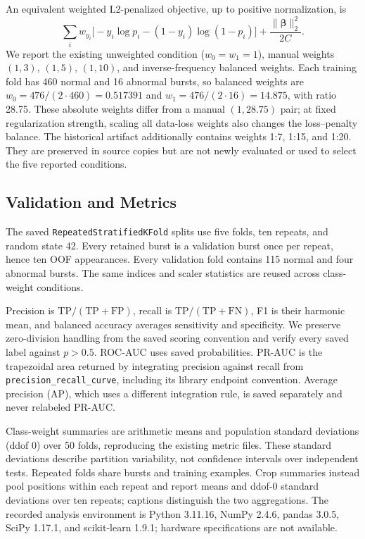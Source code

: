 \documentclass[10pt,twocolumn,letterpaper]{article}
\begin{document}
An equivalent weighted L2-penalized objective, up to positive normalization, is
\begin{equation}
\sum_i w_{y_i}\big[-y_i\log p_i-(1-y_i)\log(1-p_i)\big]
+\frac{\|\boldsymbol{\beta}\|_2^2}{2C}.
\end{equation}
We report the existing unweighted condition ($w_0=w_1=1$), manual weights $(1,3)$, $(1,5)$, $(1,10)$, and inverse-frequency balanced weights. Each training fold has 460 normal and 16 abnormal bursts, so balanced weights are $w_0=476/(2\cdot460)=0.517391$ and $w_1=476/(2\cdot16)=14.875$, with ratio 28.75. These absolute weights differ from a manual $(1,28.75)$ pair; at fixed regularization strength, scaling all data-loss weights also changes the loss--penalty balance. The historical artifact additionally contains weights 1:7, 1:15, and 1:20. They are preserved in source copies but are not newly evaluated or used to select the five reported conditions.

\subsection{Validation and Metrics}
The saved \texttt{RepeatedStratifiedKFold} splits use five folds, ten repeats, and random state 42. Every retained burst is a validation burst once per repeat, hence ten OOF appearances. Every validation fold contains 115 normal and four abnormal bursts. The same indices and scaler statistics are reused across class-weight conditions.

Precision is $\mathrm{TP}/(\mathrm{TP}+\mathrm{FP})$, recall is $\mathrm{TP}/(\mathrm{TP}+\mathrm{FN})$, F1 is their harmonic mean, and balanced accuracy averages sensitivity and specificity. We preserve zero-division handling from the saved scoring convention and verify every saved label against $p>0.5$. ROC-AUC uses saved probabilities. PR-AUC is the trapezoidal area returned by integrating precision against recall from \texttt{precision\_recall\_curve}, including its library endpoint convention. Average precision (AP), which uses a different integration rule, is saved separately and never relabeled PR-AUC.

Class-weight summaries are arithmetic means and population standard deviations (ddof 0) over 50 folds, reproducing the existing metric files. These standard deviations describe partition variability, not confidence intervals over independent tests. Repeated folds share bursts and training examples. Crop summaries instead pool positions within each repeat and report means and ddof-0 standard deviations over ten repeats; captions distinguish the two aggregations. The recorded analysis environment is Python 3.11.16, NumPy 2.4.6, pandas 3.0.5, SciPy 1.17.1, and scikit-learn 1.9.1; hardware specifications are not available.
\end{document}
